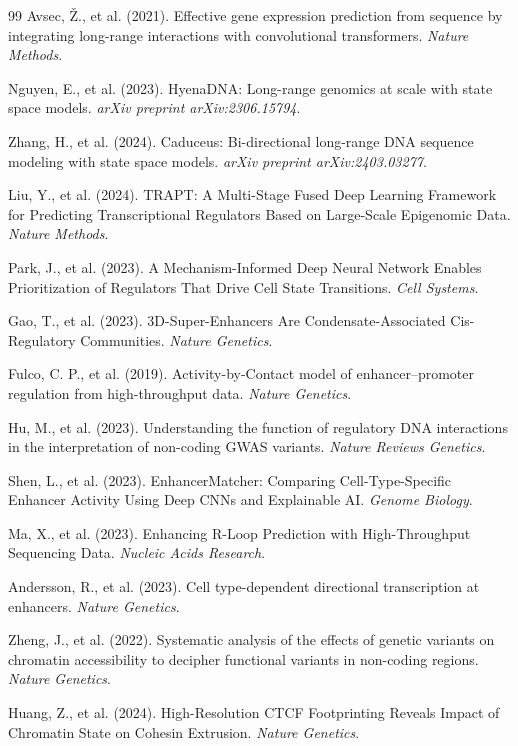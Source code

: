 \documentclass[11pt,a4paper]{article}
\begin{document}
\begin{thebibliography}{99}
Avsec, \v{Z}., et al. (2021). Effective gene expression prediction from sequence by integrating long-range interactions with convolutional transformers. \textit{Nature Methods}.

Nguyen, E., et al. (2023). HyenaDNA: Long-range genomics at scale with state space models. \textit{arXiv preprint arXiv:2306.15794}.

Zhang, H., et al. (2024). Caduceus: Bi-directional long-range DNA sequence modeling with state space models. \textit{arXiv preprint arXiv:2403.03277}.

Liu, Y., et al. (2024). TRAPT: A Multi-Stage Fused Deep Learning Framework for Predicting Transcriptional Regulators Based on Large-Scale Epigenomic Data. \textit{Nature Methods}.

Park, J., et al. (2023). A Mechanism-Informed Deep Neural Network Enables Prioritization of Regulators That Drive Cell State Transitions. \textit{Cell Systems}.

Gao, T., et al. (2023). 3D-Super-Enhancers Are Condensate-Associated Cis-Regulatory Communities. \textit{Nature Genetics}.

Fulco, C. P., et al. (2019). Activity-by-Contact model of enhancer--promoter regulation from high-throughput data. \textit{Nature Genetics}.

Hu, M., et al. (2023). Understanding the function of regulatory DNA interactions in the interpretation of non-coding GWAS variants. \textit{Nature Reviews Genetics}.

Shen, L., et al. (2023). EnhancerMatcher: Comparing Cell-Type-Specific Enhancer Activity Using Deep CNNs and Explainable AI. \textit{Genome Biology}.

Ma, X., et al. (2023). Enhancing R-Loop Prediction with High-Throughput Sequencing Data. \textit{Nucleic Acids Research}.

Andersson, R., et al. (2023). Cell type-dependent directional transcription at enhancers. \textit{Nature Genetics}.

Zheng, J., et al. (2022). Systematic analysis of the effects of genetic variants on chromatin accessibility to decipher functional variants in non-coding regions. \textit{Nature Genetics}.

Huang, Z., et al. (2024). High-Resolution CTCF Footprinting Reveals Impact of Chromatin State on Cohesin Extrusion. \textit{Nature Genetics}.


\end{thebibliography}
\end{document}
